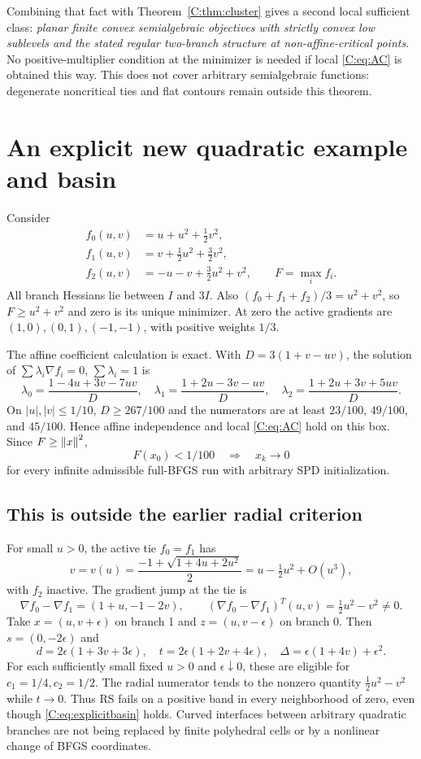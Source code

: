 \documentclass[10pt,oneside,openany]{book}
\theoremstyle{remark}\newtheorem{remark}{Remark}[chapter]
\begin{document}
Combining that fact with Theorem~\ref{C:thm:cluster} gives a second local sufficient class: \emph{planar finite convex semialgebraic objectives with strictly convex low sublevels and the stated regular two-branch structure at non-affine-critical points}. No positive-multiplier condition at the minimizer is needed if local \eqref{C:eq:AC} is obtained this way. This does not cover arbitrary semialgebraic functions: degenerate noncritical ties and flat contours remain outside this theorem.


\setcounter{section}{7}
\setcounter{theorem}{7}
\setcounter{equation}{16}
\section{An explicit new quadratic example and basin}
Consider
\begin{align*}
 f_0(u,v)&=u+u^2+\tfrac12v^2,\\
 f_1(u,v)&=v+\tfrac12u^2+\tfrac32v^2,\\
 f_2(u,v)&=-u-v+\tfrac32u^2+v^2,\qquad F=\max_i f_i.
\end{align*}
All branch Hessians lie between $I$ and $3I$. Also $(f_0+f_1+f_2)/3=u^2+v^2$, so $F\ge u^2+v^2$ and zero is its unique minimizer. At zero the active gradients are $(1,0),(0,1),(-1,-1)$, with positive weights $1/3$.

The affine coefficient calculation is exact. With $D=3(1+v-uv)$, the solution of $\sum\lambda_i\nabla f_i=0$, $\sum\lambda_i=1$ is
\[
 \lambda_0=\frac{1-4u+3v-7uv}{D},\quad
 \lambda_1=\frac{1+2u-3v-uv}{D},\quad
 \lambda_2=\frac{1+2u+3v+5uv}{D}.
\]
On $|u|,|v|\le1/10$, $D\ge267/100$ and the numerators are at least $23/100$, $49/100$, and $45/100$. Hence affine independence and local \eqref{C:eq:AC} hold on this box. Since $F\ge\left\lVert x\right\rVert^2$,
\begin{equation}\label{C:eq:explicitbasin}
 \boxed{F(x_0)<1/100\quad\Longrightarrow\quad x_k\to0}
\end{equation}
for every infinite admissible full-BFGS run with arbitrary SPD initialization.

\subsection{This is outside the earlier radial criterion}
For small $u>0$, the active tie $f_0=f_1$ has
\[
 v=v(u)=\frac{-1+\sqrt{1+4u+2u^2}}2
 =u-\tfrac12u^2+O(u^3),
\]
with $f_2$ inactive. The gradient jump at the tie is
\[
 \nabla f_0-\nabla f_1=(1+u,-1-2v),\qquad
 (\nabla f_0-\nabla f_1)^T(u,v)=\tfrac12u^2-v^2\ne0.
\]
Take $x=(u,v+\epsilon)$ on branch 1 and $z=(u,v-\epsilon)$ on branch 0. Then $s=(0,-2\epsilon)$ and
\[
 d=2\epsilon(1+3v+3\epsilon),\quad
 t=2\epsilon(1+2v+4\epsilon),\quad
 \Delta=\epsilon(1+4v)+\epsilon^2.
\]
For each sufficiently small fixed $u>0$ and $\epsilon\downarrow0$, these are eligible for $c_1=1/4,c_2=1/2$. The radial numerator tends to the nonzero quantity $\tfrac12u^2-v^2$ while $t\to0$. Thus RS fails on a positive band in every neighborhood of zero, even though \eqref{C:eq:explicitbasin} holds. Curved interfaces between arbitrary quadratic branches are not being replaced by finite polyhedral cells or by a nonlinear change of BFGS coordinates.
\end{document}

